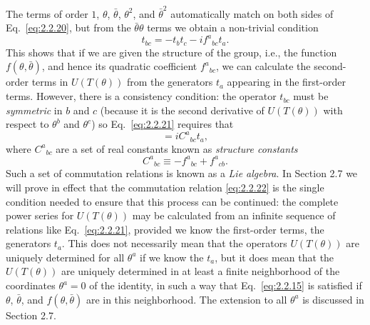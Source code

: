 The terms of order $1$, $\theta$, $\bar\theta$, $\theta^2$, and
$\bar\theta^2$ automatically match on both sides of Eq.~\eqref{eq:2.2.20}, but
from the $\bar\theta\theta$ terms we obtain a non-trivial condition
\begin{equation}
  t_{bc}=-t_b t_c-i f^a{}_{bc}t_a.
  \tag{2.2.21}\label{eq:2.2.21}
\end{equation}
This shows that if we are given the structure of the group, i.e., the
function $f(\theta,\bar\theta)$, and hence its quadratic coefficient
$f^a{}_{bc}$, we can calculate the second-order terms in $U(T(\theta))$
from the generators $t_a$ appearing in the first-order terms. However,
there is a consistency condition: the operator $t_{bc}$ must be
\emph{symmetric} in $b$ and $c$ (because it is the second derivative of
$U(T(\theta))$ with respect to $\theta^b$ and $\theta^c$) so Eq.~\eqref{eq:2.2.21}
requires that
\begin{equation}
  [t_b,t_c]=iC^a{}_{bc}t_a,
  \tag{2.2.22}\label{eq:2.2.22}
\end{equation}
where $C^a{}_{bc}$ are a set of real constants known as \emph{structure
constants}
\begin{equation}
  C^a{}_{bc}\equiv-f^a{}_{bc}+f^a{}_{cb}.
  \tag{2.2.23}\label{eq:2.2.23}
\end{equation}
Such a set of commutation relations is known as a \emph{Lie algebra}. In
Section 2.7 we will prove in effect that the commutation relation \eqref{eq:2.2.22}
is the single condition needed to ensure that this process can be
continued: the complete power series for $U(T(\theta))$ may be calculated
from an infinite sequence of relations like Eq.~\eqref{eq:2.2.21}, provided we know
the first-order terms, the generators $t_a$. This does not necessarily mean
that the operators $U(T(\theta))$ are uniquely determined for all
$\theta^a$ if we know the $t_a$, but it does mean that the $U(T(\theta))$
are uniquely determined in at least a finite neighborhood of the
coordinates $\theta^a=0$ of the identity, in such a way that Eq.~\eqref{eq:2.2.15}
is satisfied if $\theta$, $\bar\theta$, and $f(\theta,\bar\theta)$ are in
this neighborhood. The extension to all $\theta^a$ is discussed in
Section 2.7.

